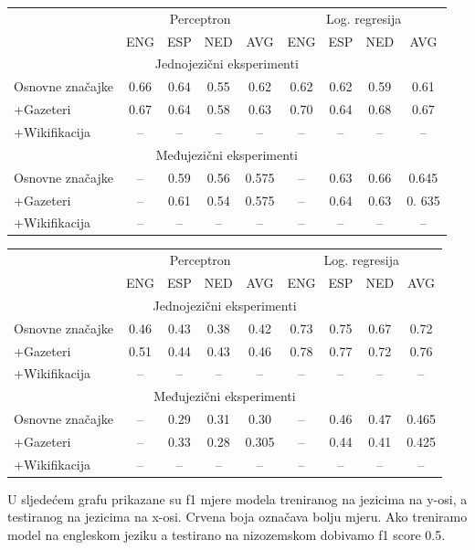 \documentclass[times, utf8, seminar]{fer}
\begin{document}
\begin{center}
\begin{tabular}{ lcccc|cccc }
\hline
& \multicolumn{4}{c}{Perceptron} & \multicolumn{4}{c}{Log. regresija} \\ 
\cline{2-5}\cline{6-9}
 & ENG & ESP & NED & AVG & ENG & ESP & NED & AVG\\ 
\hline
\multicolumn{9}{c}{Jednojezični eksperimenti } \\
\hline
Osnovne značajke & 0.66 & 0.64 & 0.55 & 0.62 & 0.62 & 0.62 & 0.59 & 0.61 \\
+Gazeteri & 0.67 & 0.64 & 0.58 & 0.63 & 0.70 & 0.64 & 0.68 & 0.67 \\
+Wikifikacija & -- & -- & -- & -- & -- & -- & -- & -- \\
\hline
\multicolumn{9}{c}{Međujezični eksperimenti } \\
\hline
Osnovne značajke & -- & 0.59 & 0.56 & 0.575 & -- & 0.63 & 0.66 & 0.645 \\
+Gazeteri & -- & 0.61 & 0.54 & 0.575 & -- & 0.64 & 0.63 & 0. 635\\
+Wikifikacija & -- & -- & -- & -- & -- & -- & -- & -- \\
\hline
\end{tabular}
\end{center}


\begin{center}
\begin{tabular}{ lcccc|cccc }
\hline
& \multicolumn{4}{c}{Perceptron} & \multicolumn{4}{c}{Log. regresija} \\ 
\cline{2-5}\cline{6-9}
 & ENG & ESP & NED & AVG & ENG & ESP & NED & AVG\\ 
\hline
\multicolumn{9}{c}{Jednojezični eksperimenti } \\
\hline
Osnovne značajke & 0.46 & 0.43 & 0.38 & 0.42 & 0.73 & 0.75 & 0.67 & 0.72 \\
+Gazeteri & 0.51 & 0.44 & 0.43 & 0.46 & 0.78 & 0.77 & 0.72 & 0.76 \\
+Wikifikacija & -- & -- & -- & -- & -- & -- & -- & --  \\
\hline
\multicolumn{9}{c}{Međujezični eksperimenti } \\
\hline
Osnovne značajke & -- & 0.29 & 0.31 & 0.30 & -- & 0.46 & 0.47 & 0.465 \\
+Gazeteri & -- & 0.33 & 0.28 & 0.305 & -- & 0.44 & 0.41 & 0.425 \\
+Wikifikacija & -- & -- & -- & -- & -- & -- & -- & --  \\
\hline
\end{tabular}
\end{center}
\newpage
U sljedećem grafu prikazane su f1 mjere modela treniranog na jezicima na y-osi, a testiranog na jezicima na x-osi. Crvena boja označava bolju mjeru. Ako treniramo model na engleskom jeziku a testirano na nizozemskom dobivamo f1 score 0.5.
\end{document}
